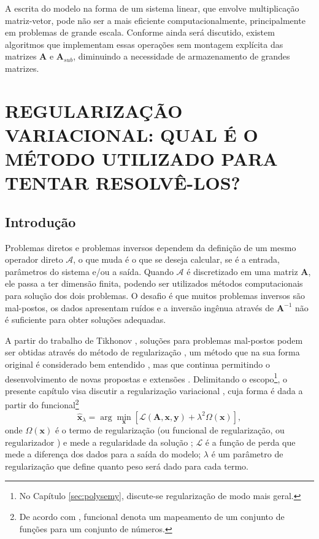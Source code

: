 A escrita do modelo na forma de um sistema linear, que envolve multiplicação matriz-vetor, pode não ser a mais eficiente computacionalmente, principalmente em problemas de grande escala. Conforme ainda será discutido, existem algoritmos que implementam essas operações sem montagem explícita das matrizes $\mathbf{A}$ e $\mathbf{A}_{sub}$, diminuindo a necessidade de armazenamento de grandes matrizes. 








\newpage
\section{REGULARIZAÇÃO VARIACIONAL: QUAL É O MÉTODO UTILIZADO PARA TENTAR RESOLVÊ-LOS?}\label{sec:variational}

\subsection{Introdução}

Problemas diretos e problemas inversos dependem da definição de um mesmo operador direto $\mathcal{A}$, o que muda é o que se deseja calcular, se é a entrada, parâmetros do sistema e/ou a saída.  Quando $\mathcal{A}$ é discretizado em uma matriz $\mathbf{A}$, ele passa a ter dimensão finita, podendo ser utilizados métodos computacionais para solução dos dois problemas. O desafio é que muitos problemas inversos são mal-postos, os dados apresentam ruídos e a inversão ingênua através de $\mathbf{A}^{-1}$ não é suficiente para obter soluções adequadas.

A partir do trabalho de Tikhonov \cite{tikhonov1977solutions}, soluções para problemas mal-postos podem ser obtidas através do método de regularização \cite{Benning2018}, um método que na sua forma original é considerado bem entendido \cite{Gerth2021}, mas que continua permitindo o desenvolvimento de novas propostas e extensões \cite{Arridge2019}. Delimitando o escopo\footnote{No Capítulo \ref{sec:polysemy}, discute-se regularização de modo mais geral.}, o presente capítulo visa discutir a regularização variacional \cite[pág. 8]{Benning2018}, cuja forma é dada a partir do funcional\footnote{De acordo com \cite[pág. 8]{Montegranario2014}, funcional denota um mapeamento de um conjunto de funções para um conjunto de números.}
\begin{equation}
\hat{\mathbf{x}}_{\lambda} = \arg\min\limits_{\mathbf{x}} \left[ \mathcal{L} \left(\mathbf{A}, \mathbf{x}, \mathbf{y} \right) + \lambda^2 \Omega(\mathbf{x}) \right],
 \label{eq:tikhonovgeral}
\end{equation}
onde  $\Omega(\mathbf{x})$ é o termo de regularização (ou funcional de regularização, ou regularizador \cite[pág. 1129]{Caselle2011}) e mede a regularidade da solução \cite[págs. 61, 172]{hansen2010discrete}; $\mathcal{L}$ é a função de perda que mede a diferença dos dados para a saída do modelo; $\lambda$ é um parâmetro de regularização que define quanto peso será dado para cada termo. 

